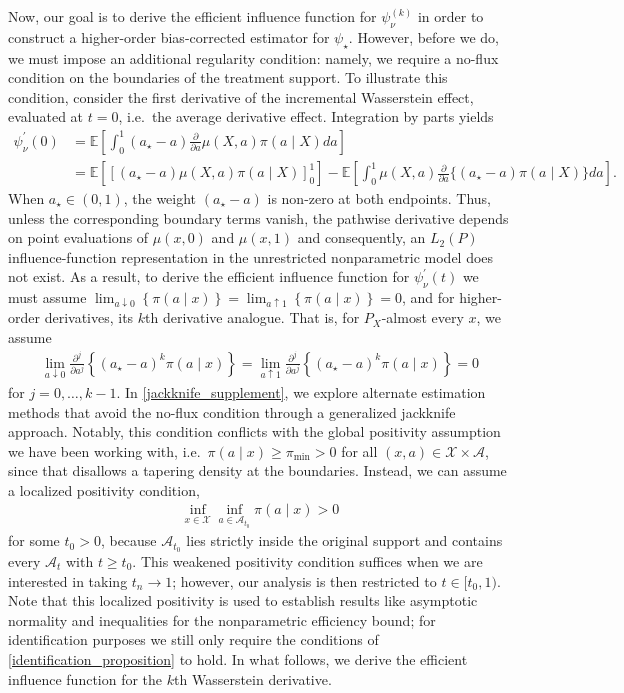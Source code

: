 \documentclass[11pt,twoside]{article}
\theoremstyle{definition}
\theoremstyle{remark}
\begin{document}
Now, our goal is to derive the efficient influence function for $\psi^{(k)}_\nu$ in order to construct a higher-order bias-corrected estimator for $\psi_\star$. However, before we do, we must impose an additional regularity condition: namely, we require a no-flux condition on the boundaries of the treatment support. To illustrate this condition, consider the first derivative of the incremental Wasserstein effect, evaluated at $t = 0$, i.e.\ the average derivative effect. Integration by parts yields
\begin{align*}
    \psi^\prime_\nu(0) &= \mathbb{E}\! \left[\int^1_0 (a_\star - a) \frac{\partial }{\partial a} \mu(X, a) \pi(a \mid X) da \right] \\
    &= \mathbb{E} \!\left[\left[(a_\star - a) \mu(X, a) \pi(a \mid X) \right]^1_0 \right] - \mathbb{E} \! \left[\int^1_0 \mu(X, a) \frac{\partial}{\partial a} \{ (a_\star - a) \pi(a \mid X) \} da \right].
\end{align*}
When $a_\star \in (0, 1)$, the weight $(a_\star - a)$ is non-zero at both endpoints. Thus, unless the corresponding boundary terms vanish, the pathwise derivative depends on point evaluations of $\mu(x, 0)$ and $\mu(x, 1)$ and consequently, an $L_2(P)$ influence-function representation in the unrestricted nonparametric model does not exist. As a result, to derive the efficient influence function for $\psi^\prime_\nu(t)$ we must assume $ \lim_{a \downarrow 0} \left\{ \pi(a\mid x) \right\} = \lim_{a \uparrow 1} \left\{ \pi(a\mid x) \right\} = 0$, and for higher-order derivatives, its $k$th derivative analogue. That is, for $P_X$-almost every $x$, we assume
\begin{align} \label{no_flux_assumption}
    \lim_{a\downarrow 0} \frac{\partial^j}{\partial a^j} \left\{ (a_\star-a)^k\pi(a\mid x) \right\} =  \lim_{a\uparrow 1} \frac{\partial^j}{\partial a^j} \left\{ (a_\star-a)^k\pi(a\mid x) \right\} = 0
\end{align}
for $j=0,\ldots,k-1$.  In \cref{jackknife_supplement}, we explore alternate estimation methods that avoid the no-flux condition through a generalized jackknife approach. Notably, this condition conflicts with the global positivity assumption we have been working with, i.e.\ $\pi(a \mid x) \geq \pi_{\min} > 0$ for all $(x, a) \in \mathcal{X} \times \mathcal{A}$, since that disallows a tapering density at the boundaries. Instead, we can assume a localized positivity condition,
\begin{align} \label{localized_positivity}
    \inf_{x\in\mathcal{X}} \inf_{a\in\mathcal{A}_{t_0}} \pi(a\mid x)>0
\end{align}
for some $t_0>0$, because $\mathcal{A}_{t_0}$ lies strictly inside the original support and contains every $\mathcal{A}_t$ with $t\geq t_0$. This weakened positivity condition suffices when we are interested in taking $t_n \to 1$; however, our analysis is then restricted to $t \in [t_0, 1)$. Note that this localized positivity is used to establish results like asymptotic normality and inequalities for the nonparametric efficiency bound; for identification purposes we still only require the conditions of \cref{identification_proposition} to hold. In what follows, we derive the efficient influence function for the $k$th Wasserstein derivative.
\end{document}
